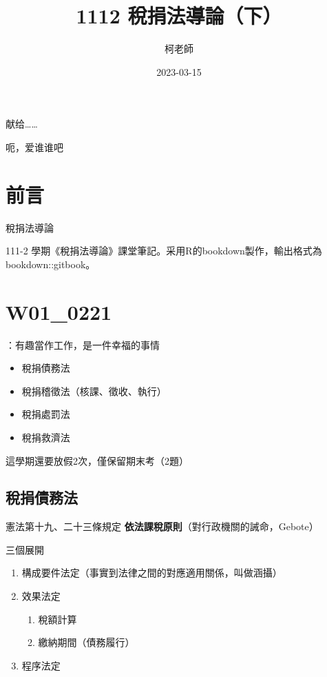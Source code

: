 \documentclass[]{ctexbook}
\title{1112 稅捐法導論（下）}
\author{柯老師}
\date{2023-03-15}
\providecommand{\tightlist}{%
  \setlength{\itemsep}{0pt}\setlength{\parskip}{0pt}}
\begin{document}
\maketitle


\thispagestyle{empty}

\begin{center}
献给……

呃，爱谁谁吧
\end{center}

\setlength{\abovedisplayskip}{-5pt}
\setlength{\abovedisplayshortskip}{-5pt}

{
\setcounter{tocdepth}{2}
\tableofcontents
}
\listoftables
\listoffigures
\hypertarget{ux524dux8a00}{%
\chapter*{前言}\label{ux524dux8a00}}


稅捐法導論

111-2 學期《稅捐法導論》課堂筆記。采用R的bookdown製作，輸出格式為bookdown::gitbook。

\mainmatter

\hypertarget{ux7b2cux4e00ux5468}{%
\chapter{W01\_0221}\label{ux7b2cux4e00ux5468}}

：有趣當作工作，是一件幸福的事情

\begin{itemize}
\tightlist
\item
  稅捐債務法
\item
  稅捐稽徵法（核課、徵收、執行）
\item
  稅捐處罰法
\item
  稅捐救濟法
\end{itemize}

這學期還要放假2次，僅保留期末考（2題）

\hypertarget{ux7a05ux6350ux50b5ux52d9ux6cd5}{%
\section{稅捐債務法}\label{ux7a05ux6350ux50b5ux52d9ux6cd5}}

憲法第十九、二十三條規定
\textbf{依法課稅原則}（對行政機關的誡命，Gebote）

三個展開

\begin{enumerate}
\def\labelenumi{\arabic{enumi}.}
\tightlist
\item
  構成要件法定（事實到法律之間的對應適用關係，叫做涵攝）
\item
  效果法定

  \begin{enumerate}
  \def\labelenumii{\arabic{enumii}.}
  \tightlist
  \item
    稅額計算
  \item
    繳納期間（債務履行）
  \end{enumerate}
\item
  程序法定
\end{enumerate}
\end{document}
